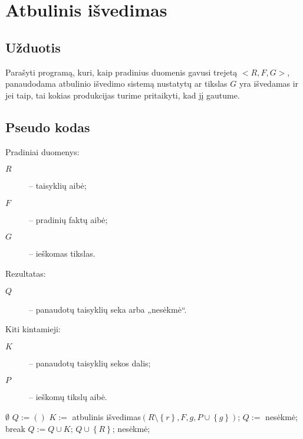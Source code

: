 \chapter{Atbulinis išvedimas}

\section{Užduotis}

Parašyti programą, kuri, kaip pradinius duomenis gavusi trejetą
$<R, F, G>$, panaudodama atbulinio išvedimo sistemą nustatytų
ar tikslas $G$ yra išvedamas ir jei taip, tai kokias produkcijas
turime pritaikyti, kad jį gautume.

\section{Pseudo kodas}

\label{sec:bc:pseudo}

Pradiniai duomenys:
\begin{description}
  \item[$R$] – taisyklių aibė;
  \item[$F$] – pradinių faktų aibė;
  \item[$G$] – ieškomas tikslas.
\end{description}

Rezultatas:
\begin{description}
  \item[$Q$] – panaudotų taisyklių seka arba „nesėkmė“.
\end{description}

Kiti kintamieji:
\begin{description}
  \item[$K$] – panaudotų taisyklių sekos dalis;
  \item[$P$] – ieškomų tikslų aibė.
\end{description}

\begin{algorithmic}[1]
     \label{bc:pseudo:goal_in_facts}
      \State \Return $\emptyset$ \label{bc:pseudo:emptyset}
    \Else
       \label{bc:pseudo:rule_iter}
        \State $Q := \left( \right)$ \label{bc:pseudo:initial_Q}
         \label{bc:pseudo:premise_iter}
          \State $K := $ atbulinis išvedimas$(%
            R\setminus \left\{ r \right\}, F, g,%
            P \cup \left\{ g \right\})$; \label{bc:pseudo:recursion}
           \label{bc:pseudo:rule:fail}
            \State $Q :=$ nesėkmė;
            \State break
          \Else \label{bc:pseudo:rule:success}
            \State $Q := Q \cup K$;
          \EndIf
           \label{bc:pseudo:success}
            \State \Return $Q \cup \left\{ R \right\}$;%
              \label{bc:pseudo:return_succ}
          \EndIf
        \EndFor
      \EndFor
      \State \Return nesėkmė; \label{bc:pseudo:failure}
    \EndIf
  \EndFunction
\end{algorithmic}

